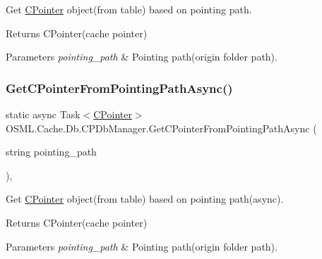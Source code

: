 Get \mbox{\hyperlink{classOSML_1_1Cache_1_1CPointer}{C\+Pointer}} object(from table) based on pointing path. 

\begin{DoxyReturn}{Returns}
C\+Pointer(cache pointer) 
\end{DoxyReturn}

\begin{DoxyParams}{Parameters}
{\em pointing\+\_\+path} & Pointing path(origin folder path).\\
\hline
\end{DoxyParams}
\mbox{\label{classOSML_1_1Cache_1_1Db_1_1CPDbManager_a60a143a4ce5799ac85101be5d1911c9a}} 
\subsubsection{\texorpdfstring{GetCPointerFromPointingPathAsync()}{GetCPointerFromPointingPathAsync()}}
{\footnotesize\ttfamily static async Task$<$\mbox{\hyperlink{classOSML_1_1Cache_1_1CPointer}{C\+Pointer}}$>$ O\+S\+M\+L.\+Cache.\+Db.\+C\+P\+Db\+Manager.\+Get\+C\+Pointer\+From\+Pointing\+Path\+Async (\begin{DoxyParamCaption}\item[{string}]{pointing\+\_\+path }\end{DoxyParamCaption})\hspace{0.3cm}{\ttfamily [inline]}, {\ttfamily [static]}}



Get \mbox{\hyperlink{classOSML_1_1Cache_1_1CPointer}{C\+Pointer}} object(from table) based on pointing path(async). 

\begin{DoxyReturn}{Returns}
C\+Pointer(cache pointer) 
\end{DoxyReturn}

\begin{DoxyParams}{Parameters}
{\em pointing\+\_\+path} & Pointing path(origin folder path).\\
\hline
\end{DoxyParams}
\mbox{\label{classOSML_1_1Cache_1_1Db_1_1CPDbManager_a6929050942d7f04fc1066d494549baa7}} 

